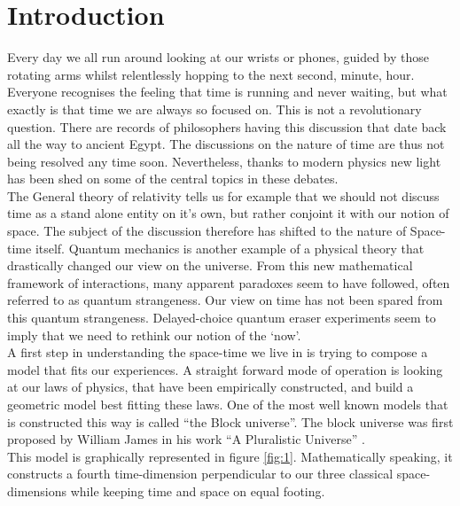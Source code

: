 \documentclass[11pt, a4 paper]{article}
\begin{document}
\section{Introduction}
\begin{multicols}{2}
Every day we all run around looking at our wrists or phones, guided by those rotating arms whilst relentlessly hopping to the next second, minute, hour. Everyone recognises the feeling that time is running and never waiting, but what exactly is that time we are always so focused on. This is not a revolutionary question. There are records of philosophers having this discussion that date back all the way to ancient Egypt.\cite{egypt} The discussions on the nature of time are thus not being resolved any time soon. Nevertheless, thanks to modern physics new light has been shed on some of the central topics in these debates. \\
The General theory of relativity tells us for example that we should not discuss time as a stand alone entity on it's own, but rather conjoint it with our notion of space. The subject of the discussion therefore has shifted to the nature of Space-time itself. Quantum mechanics is another example of a physical theory that drastically changed our view on the universe. From this new mathematical framework of interactions, many apparent paradoxes seem to have followed, often referred to as quantum strangeness. Our view on time has not been spared from this quantum strangeness. Delayed-choice quantum eraser experiments seem to imply that we need to rethink our notion of the `now'.\\
A first step in understanding the space-time we live in is trying to compose a model that fits our experiences. A straight forward mode of operation is looking at our laws of physics, that have been empirically constructed, and build a geometric model best fitting these laws. One of the most well known models that is constructed this way is called ``the Block universe''. The block universe was first proposed by William James in his work ``A Pluralistic Universe'' \cite{quote}.\\
This model is graphically represented in figure \ref{fig:1}. Mathematically speaking, it constructs a fourth time-dimension perpendicular to our three classical space-dimensions while keeping time and space on equal footing.
\begin{figure}

\end{figure}
\end{multicols}
\end{document}

